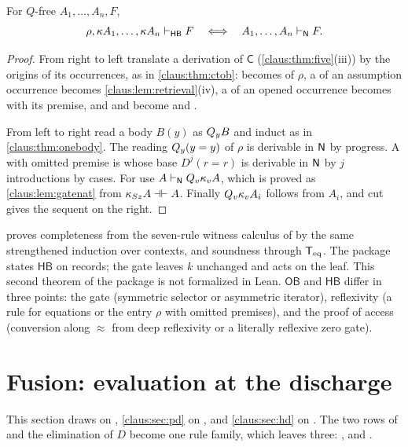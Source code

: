 \begin{theorem}
\label{claus:thm:homog}
For $Q$-free $A_1,\dots,A_n,F$,
\[
 \rho,\kappa A_1,\dots,\kappa A_n\vdash_{\mathsf{HB}}F
 \quad\Longleftrightarrow\quad
 A_1,\dots,A_n\vdash_{\mathsf{N}}F .
\]
\end{theorem}
\begin{proof}
From right to left translate a derivation of $\mathsf{C}$
(\cref{claus:thm:five}(iii)) by the origins of its occurrences, as in
\cref{claus:thm:ctob}:  becomes  of $\rho$, a
 of an assumption occurrence becomes
\cref{claus:lem:retrieval}(iv), a  of an opened occurrence
becomes  with its premise, and  and
 become  and .

From left to right read a body $B(y)$ as $Q_{y}B$ and induct as in
\cref{claus:thm:onebody}. The reading $Q_{y}(y=y)$ of $\rho$ is derivable
in $\mathsf{N}$ by progress. A  with omitted premise is  whose
base $D^j(r=r)$ is derivable in $\mathsf{N}$ by $j$ introductions by cases. For
 use $A\vdash_{\mathsf{N}}Q_{v}\kappa_vA$, which is proved as
\cref{claus:lem:gatenat} from $\kappa_{S z}A\dashv\vdash A$. Finally
$Q_{v}\kappa_vA_i$ follows from $A_i$, and cut gives the sequent on the
right.
\end{proof}

\begin{remark}
\label{claus:rem:hbpkgs}
 proves completeness from the seven-rule witness
calculus of  by the same strengthened induction over
contexts, and soundness through $\mathsf{T}_{\mathrm{eq}}$. The package states $\mathsf{HB}$
on records; the gate leaves $k$ unchanged and acts on the leaf. This
second theorem of the package is not formalized in Lean.
$\mathsf{OB}$ and $\mathsf{HB}$ differ in three points: the gate
(symmetric selector or asymmetric iterator), reflexivity (a rule for
equations or the entry $\rho$ with omitted premises), and the proof of
access (conversion along $\approx$ from deep reflexivity or a literally
reflexive zero gate).
\end{remark}

\section{Fusion: evaluation at the discharge}
\label{claus:sec:fusion}

This section draws on ,
\cref{claus:sec:pd} on , and
\cref{claus:sec:hd} on . The two rows of
 and the elimination of $D$ become one rule family, which
leaves three: ,  and .


